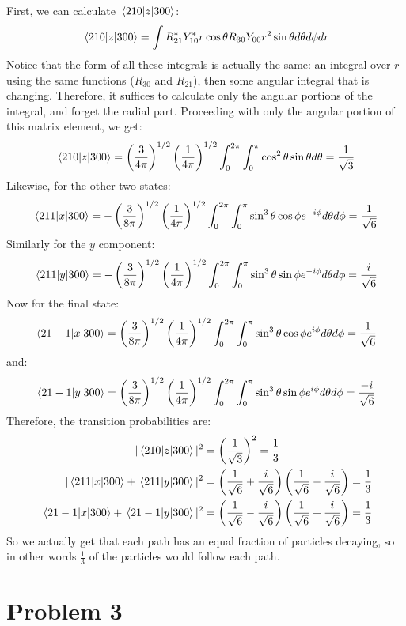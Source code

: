 \documentclass[10pt]{article}
\begin{document}
\begin{enumerate}[label=(\alph*)]
\begin{solution}
			First, we can calculate $\mel{210}{z}{300}$:
			\[ \mel{210}{z}{300} = \int R_{21}^* Y_{10}^* r\cos \theta R_{30}Y_{00} r^2 \sin \theta d\theta d\phi dr\]
			Notice that the form of all these integrals is actually the same: an integral over $r$ using the same functions ($R_{30}$ and $R_{21}$), then some angular integral that is changing. Therefore, it suffices to calculate only the angular portions of the integral, and forget the radial part. Proceeding with only the angular portion of this matrix element, we get:
			\[ \mel{210}{z}{300} = \left( \frac{3}{4\pi}\right)^{1/2} \left(\frac{1}{4\pi}\right)^{1/2}\int_0^{2\pi}\int_0^\pi \cos^2 \theta \sin \theta d\theta = \frac{1}{\sqrt{3}}\]
			Likewise, for the other two states:
			\[ \mel{211}{x}{300} = -\left( \frac{3}{8\pi}\right)^{1/2} \left( \frac{1}{4\pi}\right)^{1/2} \int_0^{2\pi} \int_0^\pi \sin^3\theta \cos \phi e^{-i\phi} d\theta d\phi = \frac{1}{\sqrt{6}}\]
			Similarly for the $y$ component:
			\[ \mel{211}{y}{300} = -\left( \frac{3}{8\pi}\right)^{1/2} \left( \frac{1}{4\pi}\right)^{1/2} \int_0^{2\pi} \int_0^\pi \sin^3\theta \sin \phi e^{-i\phi} d\theta d\phi = \frac{i}{\sqrt{6}}\]
			Now for the final state:
			\[ \mel{21-1}{x}{300} = \left( \frac{3}{8\pi}\right)^{1/2} \left( \frac{1}{4\pi}\right)^{1/2} \int_0^{2\pi} \int_0^\pi \sin^3\theta \cos \phi e^{i\phi} d\theta d\phi = \frac{1}{\sqrt{6}}\]
			and:
			\[ \mel{21-1}{y}{300} = \left( \frac{3}{8\pi}\right)^{1/2} \left( \frac{1}{4\pi}\right)^{1/2} \int_0^{2\pi} \int_0^\pi \sin^3\theta \sin \phi e^{i\phi} d\theta d\phi = \frac{-i}{\sqrt{6}}\]
			Therefore, the transition probabilities are: 
			\begin{align*}
				|\mel{210}{z}{300}|^2 &= \left( \frac{1}{\sqrt{3}}\right)^2 = \frac13\\
				|\mel{211}{x}{300} + \mel{211}{y}{300}|^2 &= \left( \frac{1}{\sqrt{6}} + \frac{i}{\sqrt{6}}\right)\left( \frac{1}{\sqrt{6}} - \frac{i}{\sqrt{6}}\right) = \frac{1}{3}\\
				|\mel{21-1}{x}{300} + \mel{21-1}{y}{300}|^2 &= \left( \frac{1}{\sqrt{6}} - \frac{i}{\sqrt{6}}\right)\left( \frac{1}{\sqrt{6}} + \frac{i}{\sqrt{6}}\right) = \frac{1}{3}
			\end{align*}
			So we actually get that each path has an equal fraction of particles decaying, so in other words $\frac 13$ of the particles would follow each path.
		\end{solution}
	\end{enumerate}
	
	\pagebreak
	\section*{Problem 3}
\end{document}

